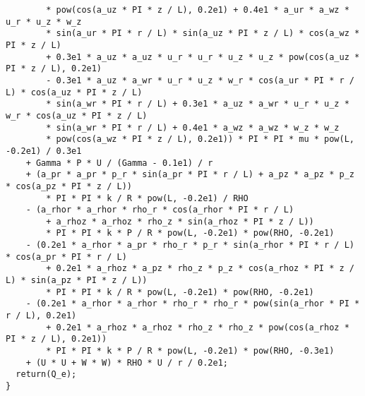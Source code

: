 \documentclass[10pt]{article}
\begin{document}
\begin{small}
\begin{verbatim}
        * pow(cos(a_uz * PI * z / L), 0.2e1) + 0.4e1 * a_ur * a_wz * u_r * u_z * w_z
        * sin(a_ur * PI * r / L) * sin(a_uz * PI * z / L) * cos(a_wz * PI * z / L)
        + 0.3e1 * a_uz * a_uz * u_r * u_r * u_z * u_z * pow(cos(a_uz * PI * z / L), 0.2e1)
        - 0.3e1 * a_uz * a_wr * u_r * u_z * w_r * cos(a_ur * PI * r / L) * cos(a_uz * PI * z / L)
        * sin(a_wr * PI * r / L) + 0.3e1 * a_uz * a_wr * u_r * u_z * w_r * cos(a_uz * PI * z / L)
        * sin(a_wr * PI * r / L) + 0.4e1 * a_wz * a_wz * w_z * w_z
        * pow(cos(a_wz * PI * z / L), 0.2e1)) * PI * PI * mu * pow(L, -0.2e1) / 0.3e1
    + Gamma * P * U / (Gamma - 0.1e1) / r
    + (a_pr * a_pr * p_r * sin(a_pr * PI * r / L) + a_pz * a_pz * p_z * cos(a_pz * PI * z / L))
        * PI * PI * k / R * pow(L, -0.2e1) / RHO
    - (a_rhor * a_rhor * rho_r * cos(a_rhor * PI * r / L)
        + a_rhoz * a_rhoz * rho_z * sin(a_rhoz * PI * z / L))
        * PI * PI * k * P / R * pow(L, -0.2e1) * pow(RHO, -0.2e1)
    - (0.2e1 * a_rhor * a_pr * rho_r * p_r * sin(a_rhor * PI * r / L) * cos(a_pr * PI * r / L)
        + 0.2e1 * a_rhoz * a_pz * rho_z * p_z * cos(a_rhoz * PI * z / L) * sin(a_pz * PI * z / L))
        * PI * PI * k / R * pow(L, -0.2e1) * pow(RHO, -0.2e1)
    - (0.2e1 * a_rhor * a_rhor * rho_r * rho_r * pow(sin(a_rhor * PI * r / L), 0.2e1)
        + 0.2e1 * a_rhoz * a_rhoz * rho_z * rho_z * pow(cos(a_rhoz * PI * z / L), 0.2e1))
        * PI * PI * k * P / R * pow(L, -0.2e1) * pow(RHO, -0.3e1)
    + (U * U + W * W) * RHO * U / r / 0.2e1;
  return(Q_e);
}
\end{verbatim}
\end{small}





\end{document}
